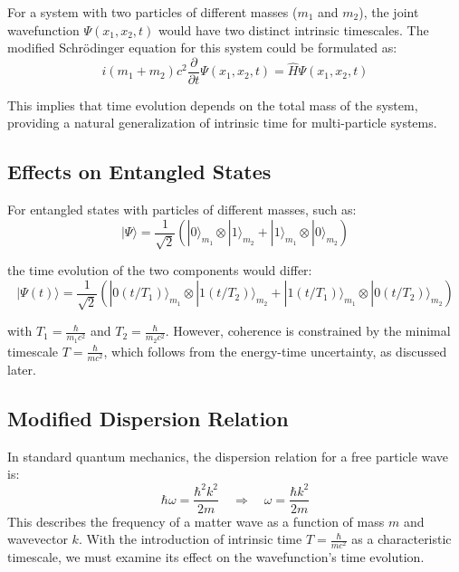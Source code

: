 \documentclass{article}
\begin{document}
	For a system with two particles of different masses (\(m_1\) and \(m_2\)), the joint wavefunction \(\Psi(x_1, x_2, t)\) would have two distinct intrinsic timescales. The modified Schrödinger equation for this system could be formulated as:
	\[
	i (m_1 + m_2) c^2 \frac{\partial}{\partial t} \Psi(x_1, x_2, t) = \hat{H} \Psi(x_1, x_2, t)
	\]
	
	This implies that time evolution depends on the total mass of the system, providing a natural generalization of intrinsic time for multi-particle systems.
	
	\subsection{Effects on Entangled States}
	
	For entangled states with particles of different masses, such as:
	\[
	|\Psi\rangle = \frac{1}{\sqrt{2}}(|0\rangle_{m_1} \otimes |1\rangle_{m_2} + |1\rangle_{m_1} \otimes |0\rangle_{m_2})
	\]
	
	the time evolution of the two components would differ:
	\[
	|\Psi(t)\rangle = \frac{1}{\sqrt{2}}(|0(t/T_1)\rangle_{m_1} \otimes |1(t/T_2)\rangle_{m_2} + |1(t/T_1)\rangle_{m_1} \otimes |0(t/T_2)\rangle_{m_2})
	\]
	
	with \(T_1 = \frac{\hbar}{m_1 c^2}\) and \(T_2 = \frac{\hbar}{m_2 c^2}\). However, coherence is constrained by the minimal timescale \(T = \frac{\hbar}{mc^2}\), which follows from the energy-time uncertainty, as discussed later.
	
\subsection{Modified Dispersion Relation}

In standard quantum mechanics, the dispersion relation for a free particle wave is:
\[
\hbar \omega = \frac{\hbar^2 k^2}{2m} \quad \Rightarrow \quad \omega = \frac{\hbar k^2}{2m}
\]
This describes the frequency of a matter wave as a function of mass \(m\) and wavevector \(k\). With the introduction of intrinsic time \(T = \frac{\hbar}{mc^2}\) as a characteristic timescale, we must examine its effect on the wavefunction's time evolution.
\end{document}
